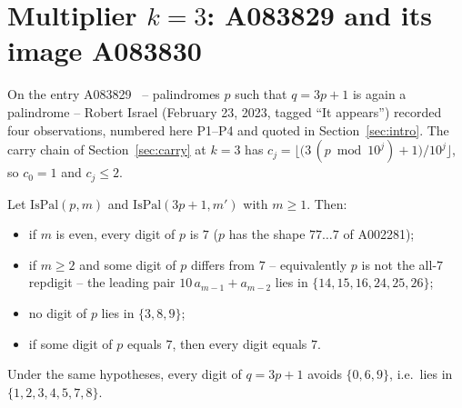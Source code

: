 \providecommand{\IsPal}{\mathrm{IsPal}}
\makeatletter
{}
\makeatother

\section{Multiplier $k = 3$: A083829 and its image A083830}
\label{sec:k3}

On the entry A083829~\cite{oeis} -- palindromes $p$ such
that $q = 3p+1$ is again a palindrome -- Robert Israel
(February 23, 2023, tagged ``It appears'') recorded four
observations, numbered here P1--P4 and quoted in
Section~\ref{sec:intro}. The carry chain of
Section~\ref{sec:carry} at $k = 3$ has
$c_j = \bigl\lfloor\bigl(3\,(p \bmod 10^{j}) + 1\bigr)
/10^{j}\bigr\rfloor$, so $c_0 = 1$ and $c_j \le 2$.

\begin{theorem}
\label{thm:k3-israel}
Let $\IsPal(p,m)$ and $\IsPal(3p+1,m')$ with $m \ge 1$.
Then:
\begin{itemize}
\item[(P1)] if $m$ is even, every digit of $p$ is $7$
($p$ has the shape $77\ldots7$ of A002281);
\item[(P2)] if $m \ge 2$ and some digit of $p$ differs
from $7$ -- equivalently $p$ is not the all-$7$
repdigit -- the leading pair $10\,a_{m-1} + a_{m-2}$
lies in $\{14, 15, 16, 24, 25, 26\}$;
\item[(P3)] no digit of $p$ lies in $\{3, 8, 9\}$;
\item[(P4)] if some digit of $p$ equals $7$, then every
digit equals $7$.
\end{itemize}
\end{theorem}

\begin{corollary}
\label{cor:k3-alphabet}
Under the same hypotheses, every digit of $q = 3p+1$
avoids $\{0, 6, 9\}$, i.e.\ lies in
$\{1,2,3,4,5,7,8\}$.
\end{corollary}

